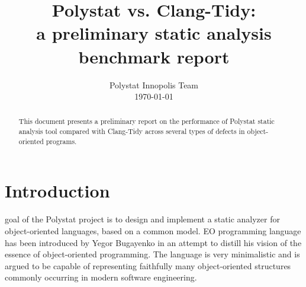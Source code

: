 
\title{Polystat vs. Clang-Tidy:\\a preliminary static analysis benchmark report}

\author{Polystat Innopolis Team \\ \today}%


\maketitle

\begin{abstract}
    This document presents a preliminary report on the performance of Polystat static analysis tool compared with Clang-Tidy across several types of defects in object-oriented programs.
\end{abstract}


\section{Introduction}

 goal of the Polystat project is to design and implement a static analyzer for object-oriented languages, based on a common model. EO programming language has been introduced by Yegor Bugayenko \cite{eolang-paper} in an attempt to distill his vision of the essence of object-oriented programming. The language is very minimalistic and is argued to be capable of representing faithfully many object-oriented structures commonly occurring in modern software engineering.

